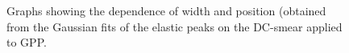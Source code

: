 \begin{figure}[H]
\centering
{}
\label{fig:ParsVsm} %
\caption[DC-smearing effects on elastic peak]{Graphs showing the dependence of width and position (obtained from the Gaussian fits %
  of the elastic peaks on the DC-smear applied to GPP.}
\end{figure}


